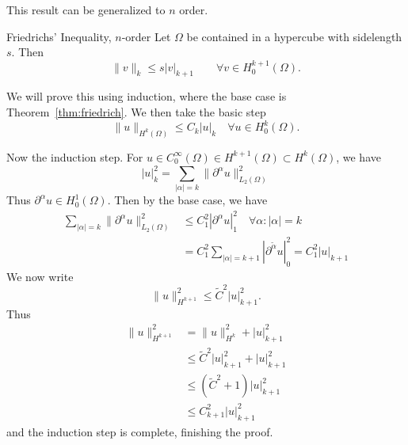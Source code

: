 This result can be generalized to $n$ order. 

\begin{kor}{Friedrichs' Inequality, $n$-order}
    Let $\Omega$ be contained in a hypercube with sidelength $s$. Then 
\begin{equation*}
    \| v \|_{k} \leq s |v|_{k+1} \quad \quad \forall v \in H_0^{k+1}(\Omega).
\end{equation*}\label{cor:friedrich_n}
\vspace{-8mm}
\end{kor}
\begin{bev}
We will prove this using induction, where the base case is Theorem~\ref*{thm:friedrich}.
We then take the basic step
\begin{equation*}
    \|u\|_{ H^k (\Omega)} \leq C_k |u|_k \quad \forall u \in H_0^k (\Omega).
\end{equation*}

Now the induction step. For $u\in C^{\infty}_0(\Omega)\in H^{k+1}(\Omega)\subset H^k(\Omega)$, we have
\begin{equation}
    |u|^2_k = \sum_{|\alpha| = k} \|\partial^\alpha u\|_{L_2(\Omega)}^2
\end{equation}
Thus $\partial^\alpha u \in H^1_0(\Omega)$. Then by the base case, we have
\begin{equation}
    \begin{split}
        \sum_{|\alpha|=k} \|\partial^\alpha u\|^2_{L_2(\Omega)} &\leq C_1^2 |\partial^\alpha u|_1^2 \quad \forall \alpha : |\alpha|=k \\
        &= C^2_1 \sum_{|\alpha|=k+1} |\partial^{\tilde{\alpha}} u |^2_0 = C_1^2 |u|_{k+1}
    \end{split}
\end{equation}  
We now write
\begin{equation}
    \|u\|^2_{H^{k+1}} \leq \tilde{C}^2 |u|^2_{k+1}.
\end{equation}
Thus
\begin{align*}
    \|u\|^2_{H^{k+1}} &=\|u\|^2_{H^k} + |u|^2_{k+1} \\
    &\leq \tilde{C}^2|u|^2_{k+1} + |u|^2_{k+1} \\
    &\leq (\tilde{C}^2 + 1)|u|^2_{k+1} \\
    &\leq C_{k+1}^2 |u|^2_{k+1}
\end{align*}
and the induction step is complete, finishing the proof.
\end{bev}